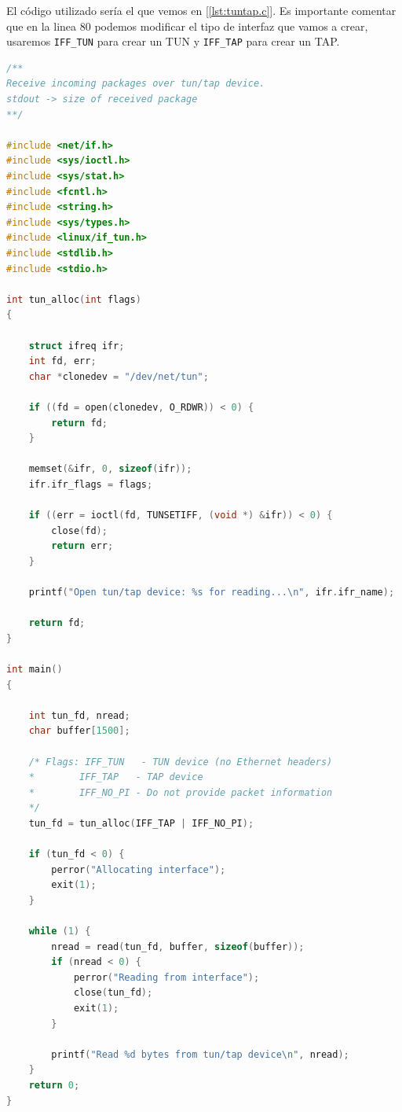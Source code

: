 \documentclass[12pt]{article}
\begin{document}
	\noindent El código utilizado sería el que vemos en [\ref{lst:tuntap.c}]. Es importante comentar que en la linea 80 podemos modificar el tipo de interfaz que vamos a crear, usaremos \texttt{IFF\_TUN} para crear un TUN y \texttt{IFF\_TAP} para crear un TAP.
	\vspace{10px}
	\begin{lstlisting}[language=C, label=lst:tuntap.c, caption=Aplicación de ejemplo para crear tun/tap (\texttt{tuntap.c}) (\ref{bib: code tuntap.c})]
/**
Receive incoming packages over tun/tap device. 
stdout -> size of received package
**/

#include <net/if.h>
#include <sys/ioctl.h>
#include <sys/stat.h>
#include <fcntl.h>
#include <string.h>
#include <sys/types.h>
#include <linux/if_tun.h>
#include <stdlib.h>
#include <stdio.h>

int tun_alloc(int flags)
{
	
	struct ifreq ifr;
	int fd, err;
	char *clonedev = "/dev/net/tun";
	
	if ((fd = open(clonedev, O_RDWR)) < 0) {
		return fd;
	}
	
	memset(&ifr, 0, sizeof(ifr));
	ifr.ifr_flags = flags;
	
	if ((err = ioctl(fd, TUNSETIFF, (void *) &ifr)) < 0) {
		close(fd);
		return err;
	}
	
	printf("Open tun/tap device: %s for reading...\n", ifr.ifr_name);
	
	return fd;
}

int main()
{
	
	int tun_fd, nread;
	char buffer[1500];
	
	/* Flags: IFF_TUN   - TUN device (no Ethernet headers)
	*        IFF_TAP   - TAP device
	*        IFF_NO_PI - Do not provide packet information
	*/
	tun_fd = tun_alloc(IFF_TAP | IFF_NO_PI);
	
	if (tun_fd < 0) {
		perror("Allocating interface");
		exit(1);
	}
	
	while (1) {
		nread = read(tun_fd, buffer, sizeof(buffer));
		if (nread < 0) {
			perror("Reading from interface");
			close(tun_fd);
			exit(1);
		}
		
		printf("Read %d bytes from tun/tap device\n", nread);
	}
	return 0;
}
	\end{lstlisting}

	\pagebreak
\end{document}

